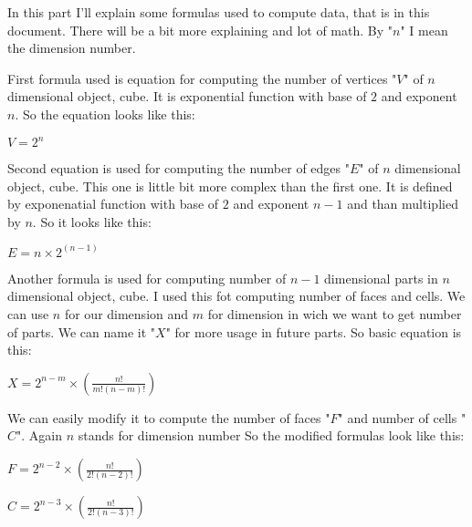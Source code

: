 \documentclass[a4paper,10pt]{article}
\begin{document}
\begin{flushleft}
\vspace{-5pt}
\vspace{\baselineskip}
    \null\large{
        \quad In this part I'll explain some formulas used to compute data, that is in this document. There will be a bit more explaining and
        lot of math. By "$n$" I mean the dimension number.
    }

\vspace{-5pt}
    \null\large{
        \quad First formula used is equation for computing the number of vertices "$V$" of $n$ dimensional object, cube. It is exponential function with
        base of $2$ and exponent $n$. So the equation looks like this:} \newline
    \null\centerline{
        \Large{
            $V = 2^{n}$
        }
    }

\vspace{-5pt}
    \null\large{
        \quad Second equation is used for computing the number of edges "$E$" of $n$ dimensional object, cube. This one is little bit more complex than the
        first one. It is defined by exponenatial function with base of $2$ and exponent $n-1$ and than multiplied by $n$. So it looks like this:} \newline
    \null\centerline{
        \Large{
            $E = n\times2^{(n-1)}$
        }
    }

\vspace{-5pt}
    \null\large{
        \quad Another formula is used for computing number of $n-1$ dimensional parts in $n$ dimensional object, cube. I used this fot computing number of faces and
        cells. We can use $n$ for our dimension and $m$ for dimension in wich we want to get number of parts. We can name it "$X$" for more usage in future parts.
        So basic equation is this:} \newline
    \null\centerline{
        \Large{
            $X = 2^{n-m}\times(\frac{n!}{m!(n-m)!})$
        }
    }

\vspace{-5pt}
    \newpage
    \null\large{
        \quad We can easily modify it to compute the number of faces "$F$" and number of cells "$C$". Again $n$ stands for dimension number So the modified formulas look like this:} \newline
    \null\centerline{
        \Large{
            $F = 2^{n-2}\times(\frac{n!}{2!(n-2)!})$
        }
    }\newline
    \null\centerline{
        \Large{
            $C = 2^{n-3}\times(\frac{n!}{2!(n-3)!})$
        }
    }

\end{flushleft}
\end{document}
